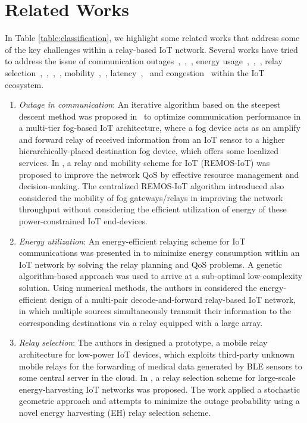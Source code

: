 \documentclass[journal]{IEEEtran}
\begin{document}
\section{Related Works}
In Table \ref{table:classification}, we highlight some related works that address some of the key challenges within a relay-based IoT network. 
Several works have tried to address the issue of communication outages~\cite{OmoniwaRelay2018},~\cite{Simiscuka2018},~\cite{Kawabata2017}, energy usage~\cite{Alsharoa2018},~\cite{Lv2018},~\cite{Behdad2018}, relay selection~\cite{OmoniwaRelay2018},~\cite{Simiscuka2018},~\cite{Manzoor2018},~\cite{Kawabata2017}, mobility~\cite{OmoniwaRelay2018},~\cite{Manzoor2018}, latency~\cite{Simiscuka2018},~\cite{Behdad2018} and congestion~\cite{Behdad2018} within the IoT ecosystem. 
\begin{enumerate}[label=\alph*)]
  \item \emph{Outage in communication}: An iterative algorithm based on the steepest descent method was proposed in~\cite{OmoniwaRelay2018} to optimize communication performance in a multi-tier fog-based IoT architecture, where a fog device acts as an amplify and forward relay of received information from an IoT sensor to a higher hierarchically-placed destination fog device, which offers some localized services. In \cite{Simiscuka2018}, a relay and mobility scheme for IoT (REMOS-IoT) was proposed to improve the network QoS by effective resource management and decision-making. The centralized REMOS-IoT algorithm introduced also considered the mobility of fog gateways/relays in improving the network throughput without considering the efficient utilization of energy of these power-constrained IoT end-devices.
  \item \emph{Energy utilization}: An energy-efficient relaying scheme for IoT communications was presented in \cite{Alsharoa2018} to minimize energy consumption within an IoT network by solving the relay planning and QoS problems. A genetic algorithm-based approach was used to arrive at a sub-optimal low-complexity solution. Using numerical methods, the authors in \cite{Lv2018} considered the energy-efficient design of a multi-pair decode-and-forward relay-based IoT network, in which multiple sources simultaneously transmit their information to the corresponding destinations via a relay equipped with a large array.
  \item \emph{Relay selection}: The authors in \cite{Manzoor2018} designed a prototype, a mobile relay architecture for low-power IoT devices, which exploits third-party unknown mobile relays for the forwarding of medical data generated by BLE sensors to some central server in the cloud. In \cite{Kawabata2017}, a relay selection scheme for large-scale energy-harvesting IoT networks was proposed. The work applied a stochastic geometric approach and attempts to minimize the outage probability using a novel energy harvesting (EH) relay selection scheme.
\end{enumerate}
\end{document}
